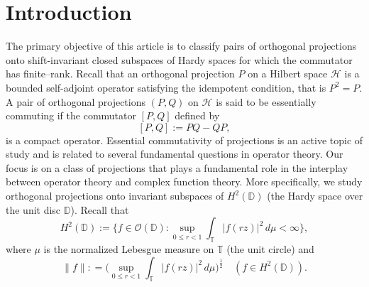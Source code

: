 \documentclass[12pt, a4 paper]{amsart}
\newcommand{\newsection}[1]{\setcounter{equation}{0} \section{#1}}
\newcommand{\clh}{\mathcal{H}}
\newcommand{\D}{\mathbb{D}}
\theoremstyle{definition}
\theoremstyle{plain}
\theoremstyle{definition}
\numberwithin{equation}{section}
\begin{document}
\newsection{Introduction}\label{sec: 1}
The primary objective of this article is to classify pairs of orthogonal projections onto shift-invariant closed subspaces of Hardy spaces for which the commutator has finite--rank. Recall that an orthogonal projection $P$ on a Hilbert space $\clh$ is a bounded self-adjoint operator satisfying the idempotent condition, that is $P^2 = P$. A pair of orthogonal projections $(P, Q)$ on $\clh$ is said to be essentially commuting if the commutator $[P, Q]$ defined by 
\[
[P, Q]:= PQ - QP,
\]
is a compact operator. Essential commutativity of projections is an active topic of study \cite{ACL, ACG} and is related to several fundamental questions in operator theory. Our focus is on a class of projections that plays a fundamental role in the interplay between operator theory and complex function theory. More specifically, we study orthogonal projections onto invariant subspaces of $H^2(\D)$ (the Hardy space over the unit disc $\D$). Recall that 
\[
H^2(\D) := \{f \in \mathcal{O}(\D): \sup_{0 \leq r <1} \int_{\mathbb{T}} |f(rz)|^2 \, d\mu < \infty\},
\]
where $\mu$ is the normalized Lebesgue measure on $\mathbb{T}$ (the unit circle) and
\[
\|f\|: =  \big( \sup_{0 \leq r <1} \int_{\mathbb{T}} |f(rz)|^2 \, d\mu \big)^{\frac{1}{2}} \quad (f \in H^2(\D)).
\]
\end{document}
